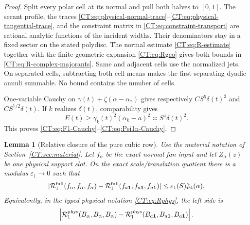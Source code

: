 \documentclass[11pt]{amsart}
\numberwithin{equation}{section}
\newtheorem{lemma}[theorem]{Lemma}
\theoremstyle{definition}
\theoremstyle{remark}
\newcommand{\Jfour}{\mathfrak J_4}
\newcommand{\Rfull}{\mathcal R_1^{\rm full}}
\newcommand{\Rphys}{\mathcal R_1^{\rm phys}}
\begin{document}
\begin{proof}
Split every polar cell at its normal and pull both halves to $[0,1]$.
The secant profile, the traces
\eqref{CT:eq:physical-normal-trace}--\eqref{CT:eq:physical-tangential-trace},
and the constraint matrix in \eqref{CT:eq:constraint-transport} are rational
analytic functions of the incident widths.  Their denominators stay in a
fixed sector on the stated polydisc.  The normal estimate
\eqref{CT:eq:R-estimate} together with the finite geometric expansion
\eqref{CT:eq:Rgeo} gives both bounds in
\eqref{CT:eq:R-complex-majorants}.  Same and adjacent cells use
the normalized jets.  On separated cells, subtracting both cell means
makes the first-separating dyadic annuli summable.  No bound contains the
number of cells.

One-variable Cauchy on
$\gamma(t)+\zeta(\alpha-\alpha_*)$ gives respectively
$CS^5\delta(t)^2$ and $CS^{7/2}\delta(t)$.  If $k$ realizes $\delta(t)$, comparability gives
\begin{equation*}
 E(t)\ge\gamma_k(t)^2(\alpha_k-a)^2
       \asymp S^4\delta(t)^2.
\end{equation*}
This proves \eqref{CT:eq:F1-Cauchy}--\eqref{CT:eq:Psi1n-Cauchy}.
\end{proof}

\begin{lemma}[Relative closure of the pure cubic row]
\label{CT:lem:R-relative}
Use the material notation of Section~\ref{CT:sec:material}.  Let $f_\alpha$
be the exact normal fan input and let
$Z_\alpha(z)$ be one physical support slot.  On the exact scale/translation
quotient there is a modulus $\varepsilon_{1}\to0$ such that
\begin{equation}
 |\Rfull(f_\alpha,f_\alpha,f_\alpha)
  -\Rfull(f_{a\mathbf1},f_{a\mathbf1},f_{a\mathbf1})|
 \le\varepsilon_1(S)\Jfour(\alpha).\label{CT:eq:R-relative-pure}
\end{equation}
Equivalently, in the typed physical notation \eqref{CT:eq:Rphys}, the left
side is
\begin{equation}
 \left|\Rphys(B_\alpha,B_\alpha,B_\alpha)
       -\Rphys(B_{a\mathbf1},B_{a\mathbf1},B_{a\mathbf1})\right|.
\end{equation}
\end{lemma}
\end{document}

